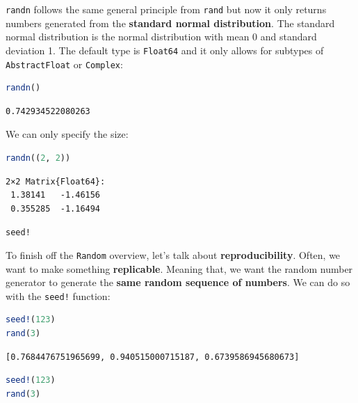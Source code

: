 \documentclass[
  notoc %
]{tufte-book}
\makeatletter
\newcommand{\passthrough}[1]{#1}
\renewcommand\subsubsection{%
\@startsection{subsubsection}{3}{\z@ }{-3.25ex\@plus -1ex \@minus -.2ex}{1.5ex \@plus .2ex}{\normalfont \normalsize \bfseries }
}
\makeatother
\begin{document}
\passthrough{\lstinline!randn!} follows the same general principle from
\passthrough{\lstinline!rand!} but now it only returns numbers generated
from the \textbf{standard normal distribution}. The standard normal
distribution is the normal distribution with mean 0 and standard
deviation 1. The default type is \passthrough{\lstinline!Float64!} and
it only allows for subtypes of \passthrough{\lstinline!AbstractFloat!}
or \passthrough{\lstinline!Complex!}:

\begin{lstlisting}[language=Julia]
randn()
\end{lstlisting}

\begin{lstlisting}[language=Output]
0.742934522080263
\end{lstlisting}

We can only specify the size:

\begin{lstlisting}[language=Julia]
randn((2, 2))
\end{lstlisting}

\begin{lstlisting}[language=Output]
2×2 Matrix{Float64}:
 1.38141   -1.46156
 0.355285  -1.16494
\end{lstlisting}

\hypertarget{sec:random_seed}{%
\subsubsection{\texorpdfstring{\texttt{seed!}}{seed!}}\label{sec:random_seed}}

To finish off the \passthrough{\lstinline!Random!} overview, let's talk
about \textbf{reproducibility}. Often, we want to make something
\textbf{replicable}. Meaning that, we want the random number generator
to generate the \textbf{same random sequence of numbers}. We can do so
with the \passthrough{\lstinline"seed!"} function:

\begin{lstlisting}[language=Julia]
seed!(123)
rand(3)
\end{lstlisting}

\begin{lstlisting}[language=Output]
[0.7684476751965699, 0.940515000715187, 0.6739586945680673]
\end{lstlisting}

\begin{lstlisting}[language=Julia]
seed!(123)
rand(3)
\end{lstlisting}
\end{document}
